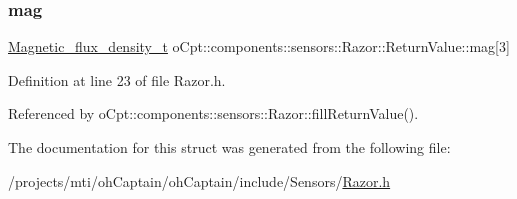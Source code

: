\subsubsection{\texorpdfstring{mag}{mag}}
{\footnotesize\ttfamily \hyperlink{classo_cpt_1_1components_1_1sensors_1_1_razor_ae8fa7bff60dd03d8603e7c7d757ae061}{Magnetic\+\_\+flux\+\_\+density\+\_\+t} o\+Cpt\+::components\+::sensors\+::\+Razor\+::\+Return\+Value\+::mag\mbox{[}3\mbox{]}}



Definition at line 23 of file Razor.\+h.



Referenced by o\+Cpt\+::components\+::sensors\+::\+Razor\+::fill\+Return\+Value().



The documentation for this struct was generated from the following file\+:\begin{DoxyCompactItemize}
\item 
/projects/mti/oh\+Captain/oh\+Captain/include/\+Sensors/\hyperlink{_razor_8h}{Razor.\+h}\end{DoxyCompactItemize}
